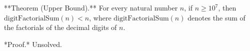
**Theorem (Upper Bound).** For every natural number $n$, if $n \geq 10^7$, then $\text{digitFactorialSum}(n) < n$, where $\text{digitFactorialSum}(n)$ denotes the sum of the factorials of the decimal digits of $n$.

*Proof.* Unsolved.